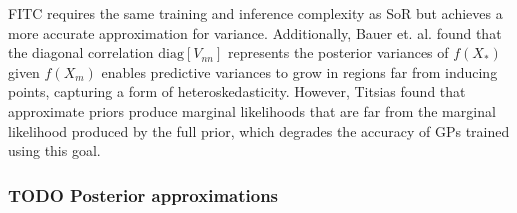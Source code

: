 FITC requires the same training and inference complexity as SoR but achieves a more accurate approximation for variance. Additionally, Bauer et. al. \cite{fitc-heteroskedasticity} found that the diagonal correlation $\text{diag}[V_{nn}]$ represents the posterior variances of $f(X_*)$ given $f(X_m)$ enables predictive variances to grow in regions far from inducing points, capturing a form of heteroskedasticity. However, Titsias found that approximate priors produce marginal likelihoods that are far from the marginal likelihood produced by the full prior, which degrades the accuracy of GPs trained using this goal. \cite{vfe}

\subsubsection{TODO Posterior approximations}

